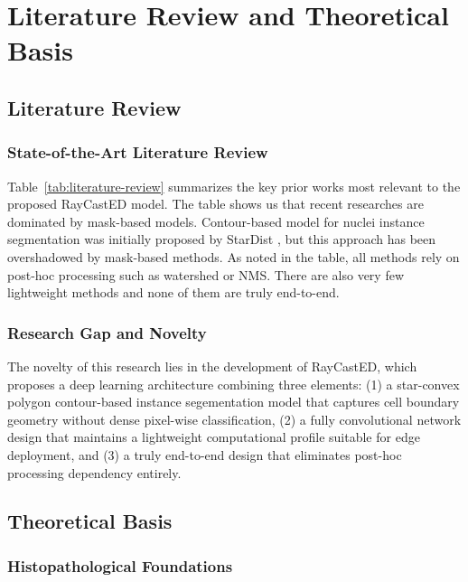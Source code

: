 \chapter{Literature Review and Theoretical Basis}

\section{Literature Review}

\subsection{State-of-the-Art Literature Review}




Table~\ref{tab:literature-review} summarizes the key prior works most relevant to the proposed RayCastED model. The table shows us that recent researches are dominated by mask-based models. Contour-based model for nuclei instance segmentation was initially proposed by StarDist \cite{schmidt2018cell, weigert2022stardist}, but this approach has been overshadowed by mask-based methods. As noted in the table, all methods rely on post-hoc processing such as watershed or NMS. There are also very few lightweight methods and none of them are truly end-to-end. 
 

\subsection{Research Gap and Novelty}

The novelty of this research lies in the development of RayCastED, which proposes a deep learning architecture combining three elements: (1) a star-convex polygon contour-based instance segementation model that captures cell boundary geometry without dense pixel-wise classification, (2) a fully convolutional network design that maintains a lightweight computational profile suitable for edge deployment, and (3) a truly end-to-end design that eliminates post-hoc processing dependency entirely.


\section{Theoretical Basis}

\subsection{Histopathological Foundations}

